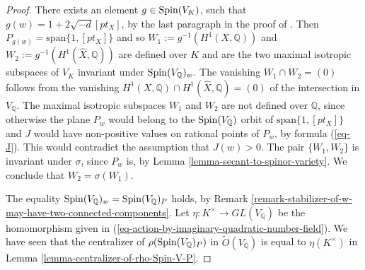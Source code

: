 \documentclass[12pt]{amsart}
\newcommand{\hide}[1]{}
\numberwithin{equation}{subsection}
\theoremstyle{plain}
\theoremstyle{definition}
\newcommand{\QQ}{{\mathbb Q}}
\newcommand{\cm}{\eta}
\newcommand{\Spin}{{\rm Spin}}
\begin{document}
\begin{proof} 
There exists an element $g\in \Spin(V_K)$, such that $g(w)=1+2\sqrt{-d}[pt_X]$, by the last paragraph in the proof of \cite[Prop. 3]{igusa}. Then $P_{g(w)}=\mbox{span}\{1,[pt_X]\}$ and so
$W_1:=g^{-1}(H^1(X,\QQ))$ and $W_2:=g^{-1}(H^1(\hat{X},\QQ))$ are defined over $K$ and are the two maximal isotropic subspaces of $V_K$ invariant under $\Spin(V_\QQ)_w$. The vanishing $W_1\cap W_2=(0)$ follows from the vanishing $H^1(X,\QQ)\cap H^1(\hat{X},\QQ)=(0)$ of the intersection in $V_\QQ$.
The maximal isotropic subspaces $W_1$ and $W_2$ are not defined over $\QQ$, since otherwise the plane $P_w$ would belong to the $\Spin(V_\QQ)$ orbit of $\mbox{span}\{1,[pt_X]\}$ and $J$ would have non-positive values on rational points of $P_w$, by formula (\ref{eq-J}). This would contradict the assumption that $J(w)>0$.
The pair $\{W_1, W_2\}$ is invariant under $\sigma$, since $P_w$ is, by Lemma \ref{lemma-secant-to-spinor-variety}. We conclude that $W_2=\sigma(W_1)$.

The equality $\Spin(V_\QQ)_w=\Spin(V_\QQ)_P$ holds, by Remark \ref{remark-stabilizer-of-w-may-have-two-connected-components}.
Let $\cm:K^\times\rightarrow GL(V_\QQ)$ be the homomorphism given in (\ref{eq-action-by-imaginary-quadratic-number-field}).
We have seen that the centralizer of $\rho(\Spin(V_\QQ)_P)$ in $\tilde{O}(V_\QQ)$
is equal to $\cm(K^\times)$ in Lemma \ref{lemma-centralizer-of-rho-Spin-V-P}.
\hide{
The subset $V_\QQ$ of $V_K$ is equal to $\{v_1+\sigma(v_1) \ : \ v_1\in W_1\}$.
Let $\cm:K^\times\rightarrow GL(V_\QQ)$ be the homomorphism given in (\ref{eq-action-by-imaginary-quadratic-number-field}).
The image of $\cm$ clearly centralizes $e(SL(W_1))$, where $e$ is given in (\ref{eq-embedding-e-of-stabilizer-of-w}), and so it centralizes $\rho(\Spin(V_\QQ)_w)$, by Lemma \ref{lemma-secant-to-spinor-variety}. 
Given $v_1, v_1'\in W_1$, set $v=v_1+\sigma(v_1)$ and $v'=v_1'+\sigma(v_1')$. 
Then 
\begin{eqnarray*}
(\cm_\lambda(v),\cm_\lambda(v'))_V&=&(\lambda v_1+\sigma(\lambda)\sigma(v_1),\lambda v_1'+\sigma(\lambda)\sigma(v_1'))_V
\\
&=&
Nm(\lambda)\left[(v_1,\sigma(v_1'))_V+(v_1',\sigma(v_1))_V\right]
=  Nm(\lambda)(v,v').
\end{eqnarray*}
Now, $Nm(\lambda)$ is positive, for all $\lambda\in K^\times$.
Hence, the image of $\cm$ is contained in $\tilde{O}(V_\QQ)$.

}
\end{proof}
\end{document}
